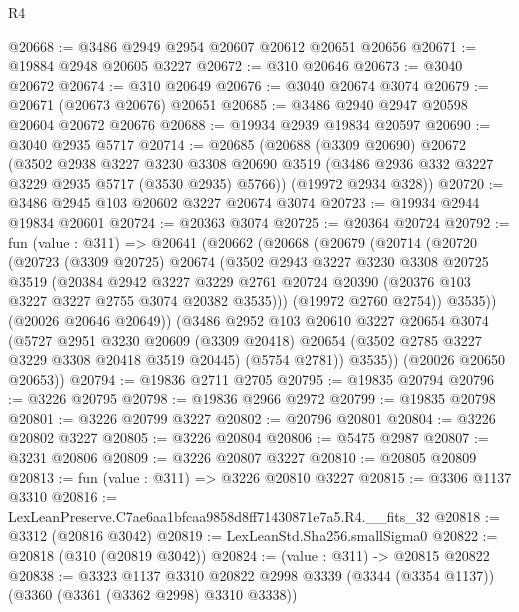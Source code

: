 \begin{lexlean}{R4}
\begin{coremodule}
@20668 := @3486 @2949 @2954 @20607 @20612 @20651 @20656
@20671 := @19884 @2948 @20605 @3227
@20672 := @310 @20646
@20673 := @3040 @20672
@20674 := @310 @20649
@20676 := @3040 @20674 @3074
@20679 := @20671 (@20673 @20676) @20651
@20685 := @3486 @2940 @2947 @20598 @20604 @20672 @20676
@20688 := @19934 @2939 @19834 @20597
@20690 := @3040 @2935 @5717
@20714 := @20685
    (@20688
      (@3309 @20690)
      @20672
      (@3502
        @2938
        @3227
        @3230
        @3308
        @20690
        @3519
        (@3486 @2936 @332 @3227 @3229 @2935 @5717 (@3530 @2935) @5766))
      (@19972 @2934 @328))
@20720 := @3486 @2945 @103 @20602 @3227 @20674 @3074
@20723 := @19934 @2944 @19834 @20601
@20724 := @20363 @3074
@20725 := @20364 @20724
@20792 := fun (value : @311) =>
  @20641
    (@20662
      (@20668
        (@20679
          (@20714
            (@20720
              (@20723
                (@3309 @20725)
                @20674
                (@3502
                  @2943
                  @3227
                  @3230
                  @3308
                  @20725
                  @3519
                  (@20384
                    @2942
                    @3227
                    @3229
                    @2761
                    @20724
                    @20390
                    (@20376 @103 @3227 @3227 @2755 @3074 @20382 @3535)))
                (@19972 @2760 @2754))
              @3535))
          (@20026 @20646 @20649))
        (@3486
          @2952
          @103
          @20610
          @3227
          @20654
          @3074
          (@5727
            @2951
            @3230
            @20609
            (@3309 @20418)
            @20654
            (@3502 @2785 @3227 @3229 @3308 @20418 @3519 @20445)
            (@5754 @2781))
          @3535))
      (@20026 @20650 @20653))
@20794 := @19836 @2711 @2705
@20795 := @19835 @20794
@20796 := @3226 @20795
@20798 := @19836 @2966 @2972
@20799 := @19835 @20798
@20801 := @3226 @20799 @3227
@20802 := @20796 @20801
@20804 := @3226 @20802 @3227
@20805 := @3226 @20804
@20806 := @5475 @2987
@20807 := @3231 @20806
@20809 := @3226 @20807 @3227
@20810 := @20805 @20809
@20813 := fun (value : @311) => @3226 @20810 @3227
@20815 := @3306 @1137 @3310
@20816 := LexLeanPreserve.C7ae6aa1bfcaa9858d8ff71430871e7a5.R4.__fits_32
@20818 := @3312 (@20816 @3042)
@20819 := LexLeanStd.Sha256.smallSigma0
@20822 := @20818 (@310 (@20819 @3042))
@20824 := (value : @311) -> @20815 @20822
@20838 := @3323
    @1137
    @3310
    @20822
    @2998
    @3339
    (@3344 (@3354 @1137))
    (@3360 (@3361 (@3362 @2998) @3310 @3338))

\end{coremodule}
\end{lexlean}
